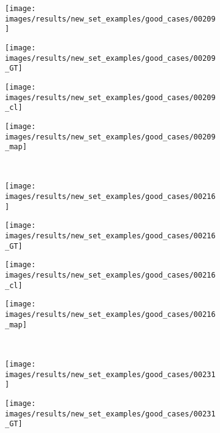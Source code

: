 \begin{figure}[t]
 \centering
 \begin{subfigure}[c]{0.24\textwidth}
  \centering
  \texttt{[image: images/results/new\_set\_examples/good\_cases/00209]}
 \end{subfigure}
 \begin{subfigure}[c]{0.24\textwidth}
  \centering
  \texttt{[image: images/results/new\_set\_examples/good\_cases/00209\_GT]}
 \end{subfigure}
 \begin{subfigure}[c]{0.24\textwidth}
  \centering
  \texttt{[image: images/results/new\_set\_examples/good\_cases/00209\_cl]}
 \end{subfigure}
 \begin{subfigure}[c]{0.24\textwidth}
  \centering
  \texttt{[image: images/results/new\_set\_examples/good\_cases/00209\_map]}
 \end{subfigure}
 \\
 \begin{subfigure}[c]{0.24\textwidth}
  \centering
  \texttt{[image: images/results/new\_set\_examples/good\_cases/00216]}
 \end{subfigure}
 \begin{subfigure}[c]{0.24\textwidth}
  \centering
  \texttt{[image: images/results/new\_set\_examples/good\_cases/00216\_GT]}
 \end{subfigure}
 \begin{subfigure}[c]{0.24\textwidth}
  \centering
  \texttt{[image: images/results/new\_set\_examples/good\_cases/00216\_cl]}
 \end{subfigure}
 \begin{subfigure}[c]{0.24\textwidth}
  \centering
  \texttt{[image: images/results/new\_set\_examples/good\_cases/00216\_map]}
 \end{subfigure}
 \\
 \begin{subfigure}[c]{0.24\textwidth}
  \centering
  \texttt{[image: images/results/new\_set\_examples/good\_cases/00231]}
 \end{subfigure}
 \begin{subfigure}[c]{0.24\textwidth}
  \centering
  \texttt{[image: images/results/new\_set\_examples/good\_cases/00231\_GT]}
 \end{subfigure}
 \begin{subfigure}[c]{0.24\textwidth}

\end{subfigure}
\end{figure}
